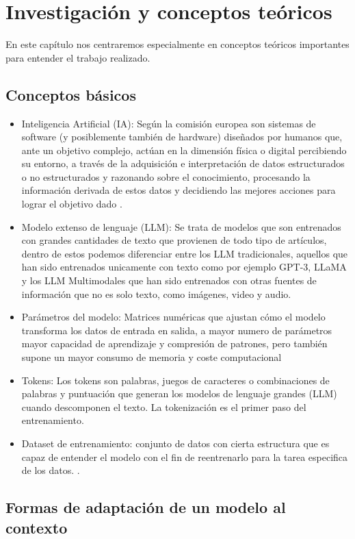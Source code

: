 \chapter{Investigación y conceptos teóricos}
En este capítulo nos centraremos especialmente en conceptos teóricos importantes para entender el trabajo realizado.
\section{Conceptos básicos}
\begin{itemize}
    \item Inteligencia Artificial (IA): Según la comisión europea son sistemas de software (y posiblemente también de hardware) diseñados por humanos que, ante un objetivo complejo, actúan en la dimensión física o digital percibiendo su entorno, a través de la adquisición e interpretación de datos estructurados o no estructurados y razonando sobre el conocimiento, procesando la información derivada de estos datos y decidiendo las mejores acciones para lograr el objetivo dado \cite{definicionIA}.
    \item Modelo extenso de lenguaje (LLM): Se trata de modelos que son entrenados con grandes cantidades de texto que provienen de todo tipo de artículos, dentro de estos podemos diferenciar entre los LLM tradicionales, aquellos que han sido entrenados unicamente con texto como por ejemplo GPT-3, LLaMA y los LLM Multimodales que han sido entrenados con otras fuentes de información que no es solo texto, como imágenes, video y audio.
    \item Parámetros del modelo: Matrices numéricas que ajustan cómo el modelo  transforma los datos de entrada en salida, a mayor numero de parámetros mayor capacidad de aprendizaje y compresión de patrones, pero también supone un mayor consumo de memoria y coste computacional
    \item Tokens: Los tokens son palabras, juegos de caracteres o combinaciones de palabras y puntuación que generan los modelos de lenguaje grandes (LLM) cuando descomponen el texto. La tokenización es el primer paso del entrenamiento.
    \item Dataset de entrenamiento: conjunto de datos con cierta estructura que es capaz de entender el modelo con el fin de reentrenarlo para la tarea especifica de los datos.
.
\end{itemize}

\section{Formas de adaptación de un modelo al contexto}

